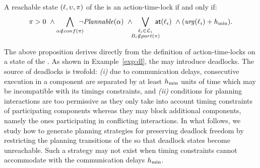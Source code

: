\begin{proposition}\label{prop:timelocks}
A reachable state $(\ell,\upsilon,\pi)$ of the \lps is an action-time-lock if and only if:
\begin{displaymath}
  \pi>0 \ \wedge \bigwedge_{\alpha \notin conf(\pi)} \hspace*{-2ex} \neg\plntxt{\alpha} \ \wedge
  \hspace*{-1ex} \bigvee_{\substack{\loc_i \in \Loc_i \\ B_i \notin \p{\pi}}} \hspace*{-2ex} 
  \al{\loc_i} \ \wedge (\urg(\loc_i) + \hmin).
\end{displaymath}
\end{proposition}
The above proposition derives directly from the definition of action-time-locks on a state 
of the \lpsb. 
As shown in Example~\ref{exp:dl}, the \lps may introduce deadlocks.
The source of deadlocks is twofold: \emph{(i)} due to communication delays, 
consecutive execution in a component are separated by at least $h_{\min}$ units of time which may 
be incompatible with its timings constraints, and \emph{(ii)} conditions for planning 
interactions are too permissive as they only take into account timing constraints of 
participating components whereas they may block additional components, namely the ones 
participating in conflicting interactions.
In what follows, we study how to generate planning strategies for preserving 
deadlock freedom by restricting the planning transitions of the \lpsabrb so that deadlock 
states become unreachable.
Such a strategy may not exist when timing constraints cannot accommodate with the 
communication delays $h_{\min}$.

